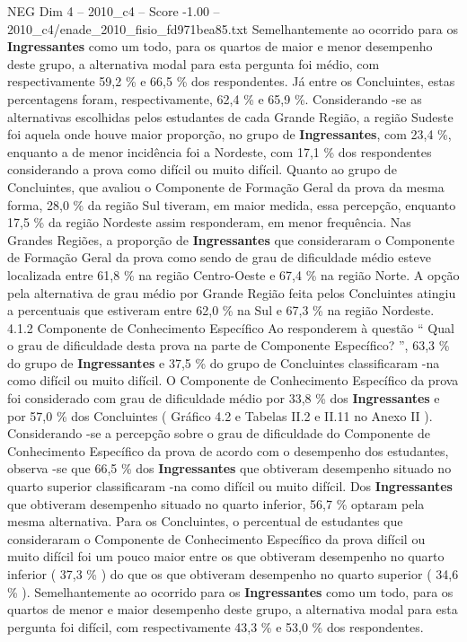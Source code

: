 \begin{textsample}{NEG Dim 4 – 2010\_c4 – Score -1.00 – 2010\_c4/enade\_2010\_fisio\_fd971bea85.txt}
Semelhantemente ao ocorrido para os \textbf{Ingressantes} como um todo, para os quartos de maior e menor desempenho deste grupo, a alternativa modal para esta pergunta foi médio, com respectivamente 59,2 \% e 66,5 \% dos respondentes.
Já entre os Concluintes, estas percentagens foram, respectivamente, 62,4 \% e 65,9 \%.
Considerando -se as alternativas escolhidas pelos estudantes de cada Grande Região, a região Sudeste foi aquela onde houve maior proporção, no grupo de \textbf{Ingressantes}, com 23,4 \%, enquanto a de menor incidência foi a Nordeste, com 17,1 \% dos respondentes considerando a prova como difícil ou muito difícil.
Quanto ao grupo de Concluintes, que avaliou o Componente de Formação Geral da prova da mesma forma, 28,0 \% da região Sul tiveram, em maior medida, essa percepção, enquanto 17,5 \% da região Nordeste assim responderam, em menor frequência.
Nas Grandes Regiões, a proporção de \textbf{Ingressantes} que consideraram o Componente de Formação Geral da prova como sendo de grau de dificuldade médio esteve localizada entre 61,8 \% na região Centro-Oeste e 67,4 \% na região Norte.
A opção pela alternativa de grau médio por Grande Região feita pelos Concluintes atingiu a percentuais que estiveram entre 62,0 \% na Sul e 67,3 \% na região Nordeste. 4.1.2 Componente de Conhecimento Específico Ao responderem à questão “ Qual o grau de dificuldade desta prova na parte de Componente Específico? ”, 63,3 \% do grupo de \textbf{Ingressantes} e 37,5 \% do grupo de Concluintes classificaram -na como difícil ou muito difícil.
O Componente de Conhecimento Específico da prova foi considerado com grau de dificuldade médio por 33,8 \% dos \textbf{Ingressantes} e por 57,0 \% dos Concluintes ( Gráfico 4.2 e Tabelas II.2 e II.11 no Anexo II ).
Considerando -se a percepção sobre o grau de dificuldade do Componente de Conhecimento Específico da prova de acordo com o desempenho dos estudantes, observa -se que 66,5 \% dos \textbf{Ingressantes} que obtiveram desempenho situado no quarto superior classificaram -na como difícil ou muito difícil.
Dos \textbf{Ingressantes} que obtiveram desempenho situado no quarto inferior, 56,7 \% optaram pela mesma alternativa.
Para os Concluintes, o percentual de estudantes que consideraram o Componente de Conhecimento Específico da prova difícil ou muito difícil foi um pouco maior entre os que obtiveram desempenho no quarto inferior ( 37,3 \% ) do que os que obtiveram desempenho no quarto superior ( 34,6 \% ).
Semelhantemente ao ocorrido para os \textbf{Ingressantes} como um todo, para os quartos de menor e maior desempenho deste grupo, a alternativa modal para esta pergunta foi difícil, com respectivamente 43,3 \% e 53,0 \% dos respondentes.

\end{textsample}

